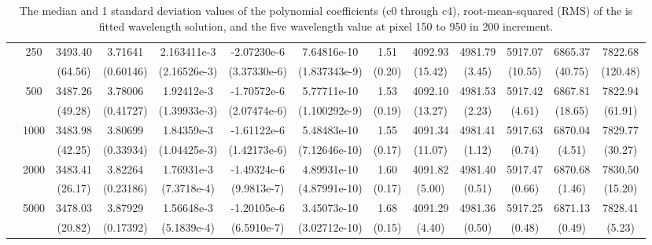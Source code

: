 \documentclass[fleqn,usenatbib]{rasti}
\begin{document}
\begin{landscape}
\begin{table}
\begin{tabular}{|c|c|ccccc|c|ccccc|}
              & \multirow{2}{*}{250} & 3493.40  & 3.71641   & 2.163411e-3  & -2.07230e-6  & 7.64816e-10  & 1.51    & 4092.93 & 4981.79 & 5917.07 & 6865.37 & 7822.68\\
              &                      & (64.56)  & (0.60146) & (2.16526e-3) & (3.37330e-6) & (1.837343e-9) & (0.20) & (15.42) & (3.45)  & (10.55) & (40.75) & (120.48)\\\cline{2-13}
              & \multirow{2}{*}{500} & 3487.26  & 3.78006   & 1.92412e-3   & -1.70572e-6  & 5.77711e-10   & 1.53   & 4092.10 & 4981.53 & 5917.42 & 6867.81 & 7822.94\\
              &                      & (49.28)  & (0.41727) & (1.39933e-3) & (2.07474e-6) & (1.100292e-9) & (0.19) & (13.27) & (2.23)  & (4.61)  & (18.65) & (61.91)\\\cline{2-13}
              & \multirow{2}{*}{1000} & 3483.98 & 3.80699   & 1.84359e-3   & -1.61122e-6  & 5.48483e-10   & 1.55   & 4091.34 & 4981.41 & 5917.63 & 6870.04 & 7829.77\\
              &                       & (42.25) & (0.33934) & (1.04425e-3) & (1.42173e-6) & (7.12646e-10) & (0.17) & (11.07) & (1.12)  & (0.74)  & (4.51)  & (30.27)\\\cline{2-13}
              & \multirow{2}{*}{2000} & 3483.41 & 3.82264   & 1.76931e-3   & -1.49324e-6  & 4.89931e-10   & 1.60   & 4091.82 & 4981.40 & 5917.47 & 6870.68 & 7830.50\\
              &                       & (26.17) & (0.23186) & (7.3718e-4)  & (9.9813e-7)  & (4.87991e-10) & (0.17) & (5.00)  & (0.51)  & (0.66)  & (1.46)  & (15.20)\\\cline{2-13}
              & \multirow{2}{*}{5000} & 3478.03 & 3.87929   & 1.56648e-3   & -1.20105e-6  & 3.45073e-10   & 1.68   & 4091.29 & 4981.36 & 5917.25 & 6871.13 & 7828.41\\
              &                       & (20.82) & (0.17392) & (5.1839e-4)  & (6.5910e-7)  & (3.02712e-10) & (0.15) & (4.40)  & (0.50)  & (0.48)  & (0.49)  & (5.23)\\\hline
    \end{tabular}
    \caption{The median and 1 standard deviation values of the polynomial coefficients (c0 through c4), root-mean-squared (RMS) of the is fitted wavelength solution, and the five wavelength value at pixel 150 to 950 in 200 increment.}
    \label{tab:stats}
\end{table}
\end{landscape}
\end{document}
